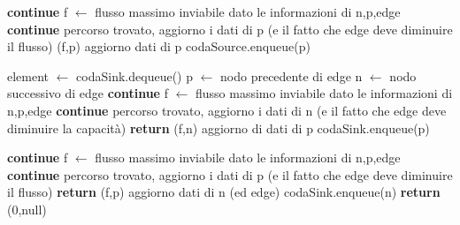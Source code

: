 \documentclass{article}
\begin{document}
\begin{algorithm}
\begin{algorithmic}[1]
\STATE \textbf{continue}
\ELSE
\STATE f $\leftarrow$ flusso massimo inviabile dato le informazioni di n,p,edge
\STATE \textbf{continue}
\ENDIF
\STATE percorso trovato, aggiorno i dati di p (e il fatto che edge deve diminuire il flusso)
\RETURN (f,p)
\ENDIF
\ENDIF
\STATE aggiorno dati di p
\STATE codaSource.enqueue(p)
\ENDIF

\ENDFOR
\ENDIF

\STATE element $\leftarrow$ codaSink.dequeue()
\STATE p $\leftarrow$ nodo precedente di edge
\STATE n $\leftarrow$ nodo successivo di edge
\STATE \textbf{continue}
\ELSE
\STATE f $\leftarrow$ flusso massimo inviabile dato le informazioni di n,p,edge
\STATE \textbf{continue}
\ENDIF
\STATE percorso trovato, aggiorno i dati di n (e il fatto che edge deve diminuire la capacità)
\STATE \textbf{return} (f,n)
\ENDIF
\ENDIF
\STATE aggiorno di dati di p
\STATE codaSink.enqueue(p)
\ENDIF
{}
\end{algorithmic}
\end{algorithm}
\newpage
\begin{algorithm}
\begin{algorithmic}[1]
\STATE \textbf{continue}
\ELSE
\STATE f $\leftarrow$ flusso massimo inviabile dato le informazioni di n,p,edge
\STATE \textbf{continue}
\ENDIF
\STATE percorso trovato, aggiorno i dati di p (e il fatto che edge deve diminuire il flusso)
\STATE \textbf{return} (f,p)
\ENDIF
\ENDIF
\STATE aggiorno dati di n (ed edge)
\STATE codaSink.enqueue(n)
\ENDIF
\ENDFOR
\ENDIF
\ENDWHILE
\STATE \textbf{return} (0,null)
\end{algorithmic}
\end{algorithm}
\end{document}

